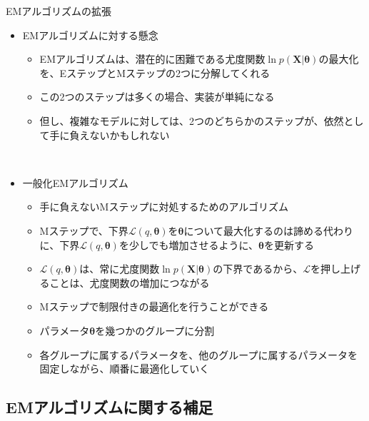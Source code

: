 \documentclass[dvipdfmx,notheorems,t]{beamer}
\begin{document}
\begin{frame}{EMアルゴリズムの拡張}

\begin{itemize}
	\item EMアルゴリズムに対する懸念
	\begin{itemize}
		\item EMアルゴリズムは、潜在的に困難である尤度関数$\ln p(\bm{X} | \bm{\theta})$の最大化を、\alert{Eステップ}と\alert{Mステップ}の2つに分解してくれる
		\item この2つのステップは多くの場合、実装が単純になる
		\newline
		\item 但し、複雑なモデルに対しては、2つのどちらかのステップが、\alert{依然として手に負えないかもしれない}
	\end{itemize} \
	
	\item 一般化EMアルゴリズム
	\begin{itemize}
		\item 手に負えないMステップに対処するためのアルゴリズム
		\item Mステップで、下界$\mathcal{L}(q, \bm{\theta})$を$\bm{\theta}$について\alert{最大化するのは諦める}代わりに、下界$\mathcal{L}(q, \bm{\theta})$を\alert{少しでも増加させるように}、$\bm{\theta}$を更新する
		\newline
		\item $\mathcal{L}(q, \bm{\theta})$は、\alert{常に}尤度関数$\ln p(\bm{X} | \bm{\theta})$の下界であるから、$\mathcal{L}$を押し上げることは、尤度関数の増加につながる
		\newline
		\item Mステップで\alert{制限付きの最適化}を行うことができる
		\item パラメータ$\bm{\theta}$を\alert{幾つかのグループに分割}
		\item 各グループに属するパラメータを、\alert{他のグループに属するパラメータを固定しながら}、\alert{順番に最適化}していく
	\end{itemize}
\end{itemize}

\end{frame}

\subsection{EMアルゴリズムに関する補足}
\end{document}
